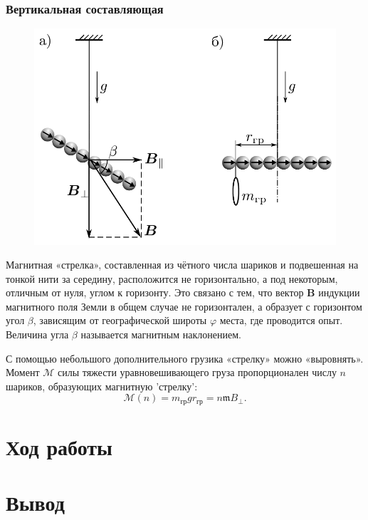 \documentclass[12pt,a4paper]{article}
\begin{document}
	\subsubsection*{Вертикальная составляющая}
	
	\begin{figure}
		\includegraphics[width=0.8\linewidth]{res/vertical.png}
	\end{figure}
	
	Магнитная «стрелка», составленная из чётного числа
	шариков и подвешенная на тонкой нити за середину, расположится не горизонтально, а под некоторым, отличным от нуля, углом к горизонту. Это связано с тем, что вектор $\boldsymbol{B}$ индукции магнитного поля Земли в общем случае не горизонтален, а образует с горизонтом
	угол $\beta$, зависящим от географической широты $\varphi$
	места, где проводится опыт. Величина угла $\beta$
	называется магнитным наклонением.
	
	С помощью небольшого дополнительного грузика «стрелку» можно «выровнять». Момент $\mathcal{M}$ силы тяжести уравновешивающего груза пропорционален числу $n$ шариков, образующих магнитную 'стрелку':
	$$\mathcal{M}(n) = m_{\text{гр}} g r_{\text{гр}} = n \mathfrak{m} B_\perp. $$
	
	\section*{Ход работы}
	
	\section*{Вывод}
	
	
\end{document}
